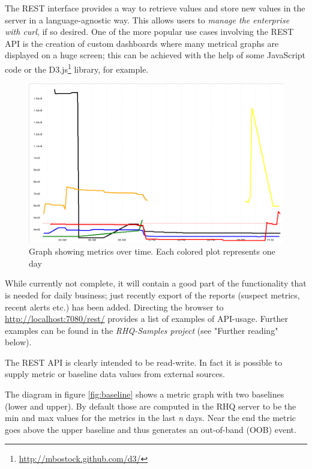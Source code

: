 \documentclass[twocolumn,10pt,a4paper]{article}
\begin{document}
The REST interface provides a way to retrieve values and store 
new values in the server in a language-agnostic way.
This allows users to \emph{manage the enterprise with curl}, if so desired. 
One of the more
popular use cases involving the REST API is the creation of custom dashboards where many metrical
graphs are displayed on a huge screen; this can be achieved with the help
of some JavaScript code or the D3.js\footnote{\url{http://mbostock.github.com/d3/}} library, for example.

\begin{figure}[h]
\noindent\includegraphics[width=\columnwidth]{graph/multigraph.png}
\caption{Graph showing metrics over time. Each colored plot represents one day}
\end{figure}

While currently not complete, it will contain a good part of the functionality
that is needed for daily business; just recently export of the reports (suspect metrics, recent alerts etc.) has been added. Directing the browser to \url{http://localhost:7080/rest/} provides a list of examples of API-usage. 
Further examples can be found in the \emph{RHQ-Samples project} (see "Further reading" below).

The REST API is clearly intended to be read-write. In fact it is possible to supply metric or baseline data values from external sources. 

The diagram in figure \ref{fig:baseline} shows a metric graph with two baselines (lower and upper). By default those are computed in the RHQ server to be the min and max values for the metrics in the last \emph{n} days. Near the end the metric goes above the upper baseline and thus generates an out-of-band (OOB) event.
\end{document}
